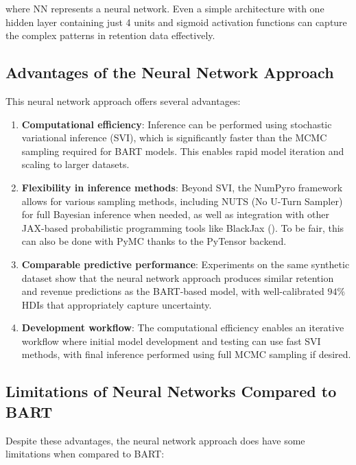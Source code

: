 \documentclass[11pt]{amsart}
\theoremstyle{definition}
\begin{document}
where $\text{NN}$ represents a neural network. Even a simple architecture with one hidden layer containing just 4 units and
sigmoid activation functions can capture the complex patterns in retention data effectively.

\subsection{Advantages of the Neural Network Approach}

This neural network approach offers several advantages:

\begin{enumerate}
    \item \textbf{Computational efficiency}: Inference can be performed using stochastic variational inference (SVI), which
          is significantly faster than the MCMC sampling required for BART models. This enables rapid model iteration and
          scaling to larger datasets.

    \item \textbf{Flexibility in inference methods}: Beyond SVI, the NumPyro framework allows for various sampling methods,
          including NUTS (No U-Turn Sampler) for full Bayesian inference when needed, as well as integration with other
          JAX-based probabilistic programming tools like BlackJax (\cite{cabezas2024blackjax}). To be fair, this can
          also be done with PyMC thanks to the PyTensor backend.

    \item \textbf{Comparable predictive performance}: Experiments on the same synthetic dataset show that the neural network
          approach produces similar retention and revenue predictions as the BART-based model, with well-calibrated $94\%$ HDIs
          that appropriately capture uncertainty.

    \item \textbf{Development workflow}: The computational efficiency enables an iterative workflow where initial model
          development and testing can use fast SVI methods, with final inference performed using full MCMC sampling if desired.
\end{enumerate}

\subsection{Limitations of Neural Networks Compared to BART}

Despite these advantages, the neural network approach does have some limitations when compared to BART:
\end{document}
